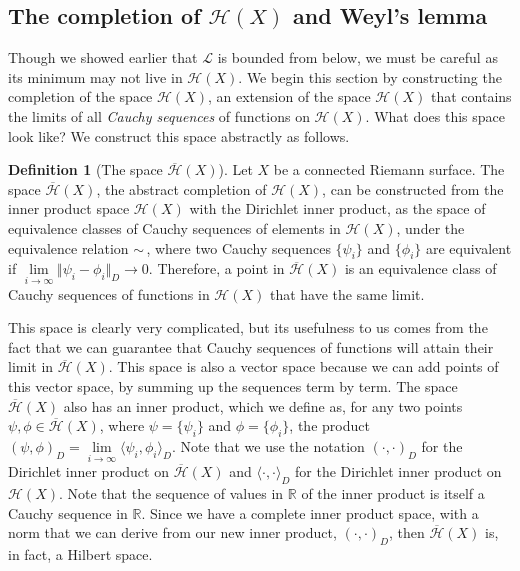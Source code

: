 \documentclass[11pt]{report}
\theoremstyle{definition}
\newtheorem{defn}[thm]{Definition}
\begin{document}
\subsection{The completion of $\mathcal{H}(X)$ and Weyl's lemma}\label{Hilbertsraumsection}
Though we showed earlier that $\mathcal{L}$ is bounded from below, we must be careful as its minimum may not live in $\mathcal{H}(X)$. We begin this section by constructing the completion of the space $\mathcal{H}(X)$, an extension of the space $\mathcal{H}(X)$ that contains the limits of all \emph{Cauchy sequences} of functions on $\mathcal{H}(X)$. What does this space look like? We construct this space abstractly as follows.
\begin{defn}[The space $\overline{\mathcal{H}}(X)$]\label{completeH}
  Let $X$ be a connected Riemann surface. The space $\overline{\mathcal{H}}(X)$, the abstract completion of $\mathcal{H}(X)$, can be constructed from the inner product space $\mathcal{H}(X)$ with the Dirichlet inner product, as the space of equivalence classes of Cauchy sequences of elements in $\mathcal{H}(X)$, under the equivalence relation $\sim \, $, where two Cauchy sequences $\{\psi_i\}$ and $\{\phi_i\}$ are equivalent if $\lim\limits_{i \rightarrow \infty}\Vert \psi_i - \phi_i\Vert_D \rightarrow 0 $.
  Therefore, a point in $\overline{\mathcal{H}}(X)$ is an equivalence class of Cauchy sequences of functions in $\mathcal{H}(X)$ that have the same limit.
\end{defn}
This space is clearly very complicated, but its usefulness to us comes from the fact that we can guarantee that Cauchy sequences of functions will attain their limit in $\overline{\mathcal{H}}(X)$. This space is also a vector space because we can add points of this vector space, by summing up the sequences term by term. The space $\overline{\mathcal{H}}(X)$ also has an inner product, which we define as, for any two points $\psi, \phi \in \overline{\mathcal{H}}(X)$, where $\psi = \{\psi_i\}$ and $\phi = \{\phi_i\}$, the product $( \psi, \phi )_D = \lim\limits_{i \rightarrow \infty} \langle \psi_i, \phi_i \rangle_D$. Note that we use the notation $( \cdot, \cdot)_D$ for the Dirichlet inner product on $\overline{\mathcal{H}}(X)$ and $\langle \cdot, \cdot \rangle_D$ for the Dirichlet inner product on $\mathcal{H}(X)$. Note that the sequence of values in $\mathbb{R}$ of the inner product is itself a Cauchy sequence in $\mathbb{R}$. Since we have a complete inner product space, with a norm that we can derive from our new inner product, $( \cdot, \cdot )_D$, then $\overline{\mathcal{H}}(X)$ is, in fact, a Hilbert space. 
\end{document}
